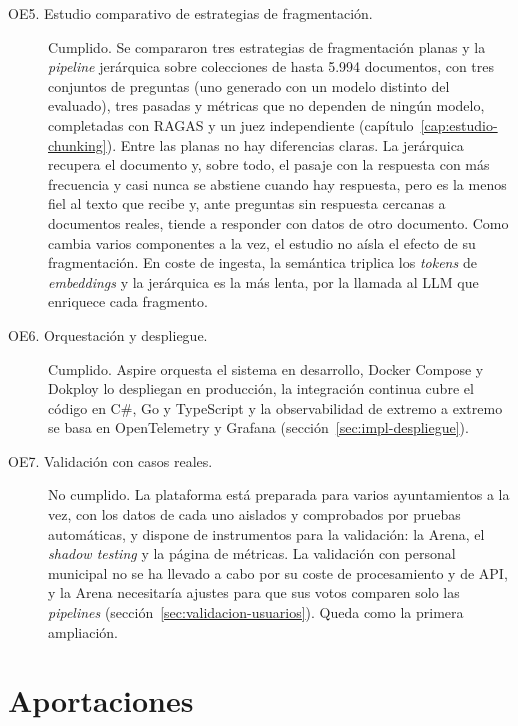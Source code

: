 \begin{description}
  \item[OE5. Estudio comparativo de estrategias de fragmentación.] Cumplido. Se compararon tres estrategias de fragmentación planas y la \emph{pipeline} jerárquica sobre colecciones de hasta 5.994 documentos, con tres conjuntos de preguntas (uno generado con un modelo distinto del evaluado), tres pasadas y métricas que no dependen de ningún modelo, completadas con RAGAS y un juez independiente (capítulo~\ref{cap:estudio-chunking}). Entre las planas no hay diferencias claras. La jerárquica recupera el documento y, sobre todo, el pasaje con la respuesta con más frecuencia y casi nunca se abstiene cuando hay respuesta, pero es la menos fiel al texto que recibe y, ante preguntas sin respuesta cercanas a documentos reales, tiende a responder con datos de otro documento. Como cambia varios componentes a la vez, el estudio no aísla el efecto de su fragmentación. En coste de ingesta, la semántica triplica los \emph{tokens} de \emph{embeddings} y la jerárquica es la más lenta, por la llamada al LLM que enriquece cada fragmento.

  \item[OE6. Orquestación y despliegue.] Cumplido. Aspire orquesta el sistema en desarrollo, Docker Compose y Dokploy lo despliegan en producción, la integración continua cubre el código en C\#, Go y TypeScript y la observabilidad de extremo a extremo se basa en OpenTelemetry y Grafana (sección~\ref{sec:impl-despliegue}).

  \item[OE7. Validación con casos reales.] No cumplido. La plataforma está preparada para varios ayuntamientos a la vez, con los datos de cada uno aislados y comprobados por pruebas automáticas, y dispone de instrumentos para la validación: la Arena, el \emph{shadow testing} y la página de métricas. La validación con personal municipal no se ha llevado a cabo por su coste de procesamiento y de API, y la Arena necesitaría ajustes para que sus votos comparen solo las \emph{pipelines} (sección~\ref{sec:validacion-usuarios}). Queda como la primera ampliación.
\end{description}

\section{Aportaciones}
\label{sec:aportaciones}

